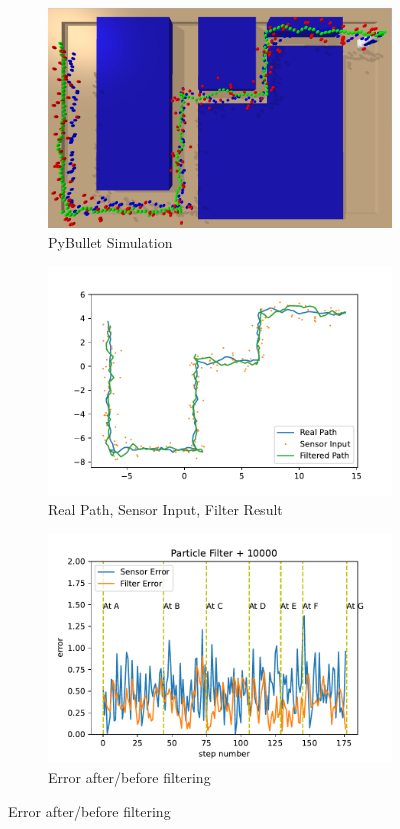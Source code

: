 \documentclass[conference,onecolumn]{IEEEtran}
\begin{document}
\begin{figure}[H]
  \begin{subfigure}[t]{.3\linewidth}
    \centering\includegraphics[width=\linewidth]{Figs/p10000.png}
    \caption{PyBullet Simulation}
  \end{subfigure}
  \begin{subfigure}[t]{.3\linewidth}
    \centering\includegraphics[width=\linewidth]{Figs/Particle Filter + 10000Path.pdf}
    \caption{Real Path, Sensor Input, Filter Result}
  \end{subfigure}
  \begin{subfigure}[t]{.3\linewidth}
    \centering\includegraphics[width=\linewidth]{Figs/Particle Filter + 10000Error.pdf}
    \caption{Error after/before filtering}
  \end{subfigure}
  

\end{figure}
\end{document}
